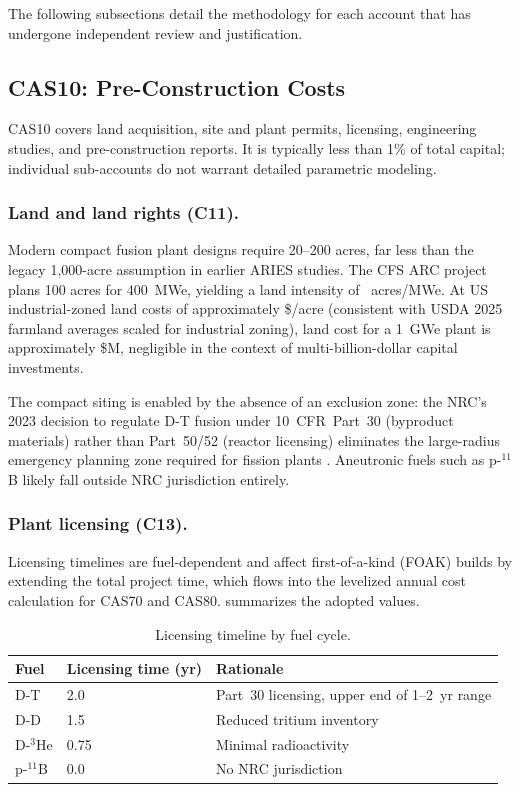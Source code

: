 \documentclass{article}
\begin{document}
The following subsections detail the methodology for each account
that has undergone independent review and justification.


\subsection{CAS10: Pre-Construction Costs}
\label{sec:cas10}

CAS10 covers land acquisition, site and plant permits, licensing,
engineering studies, and pre-construction reports. It is typically less
than 1\% of total capital; individual sub-accounts do not warrant
detailed parametric modeling.

\subsubsection{Land and land rights (C11).}
Modern compact fusion plant designs require 20--200 acres, far less
than the legacy 1{,}000-acre assumption in earlier ARIES studies.
The CFS ARC project \citep{cfs_arc} plans 100 acres for 400~MWe,
yielding a land intensity of ~acres/MWe. At US
industrial-zoned land costs of approximately
\$/acre
(consistent with USDA 2025 farmland averages scaled for
industrial zoning), land cost for a 1~GWe plant is approximately
\$M, negligible in the context of multi-billion-dollar capital
investments.

The compact siting is enabled by the absence of an exclusion zone:
the NRC's 2023 decision to regulate D-T fusion under 10~CFR~Part~30
(byproduct materials) rather than Part~50/52 (reactor licensing)
eliminates the large-radius emergency planning zone required for
fission plants \citep{nrc2023}. Aneutronic fuels such as p-${}^{11}$B
likely fall outside NRC jurisdiction entirely.

\subsubsection{Plant licensing (C13).}
Licensing timelines are fuel-dependent and affect first-of-a-kind
(FOAK) builds by extending the total project time, which flows into
the levelized annual cost calculation for CAS70 and CAS80.
 summarizes the adopted values.

\begin{table}[htbp]
\caption{Licensing timeline by fuel cycle.}
\label{tab:licensing}
\centering
\begin{tabular}{lll}
\toprule
Fuel & Licensing time (yr) & Rationale \\
\midrule
D-T   & 2.0 & Part~30 licensing, upper end of 1--2~yr range \\
D-D   & 1.5 & Reduced tritium inventory \\
D-${}^3$He & 0.75 & Minimal radioactivity \\
p-${}^{11}$B & 0.0 & No NRC jurisdiction \\
\bottomrule
\end{tabular}
\end{table}
\end{document}
